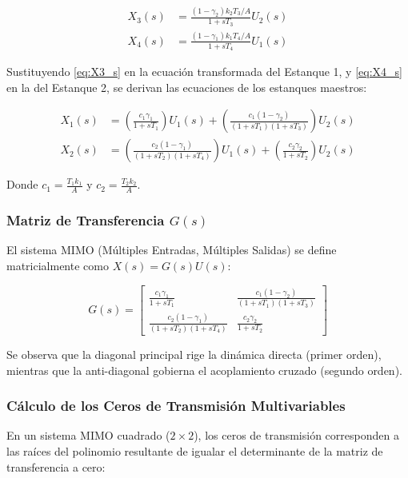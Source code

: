 \begin{align}
X_3(s) &= \frac{(1-\gamma_2) k_2 T_3 / A}{1 + sT_3} U_2(s) \label{eq:X3_s} \\
X_4(s) &= \frac{(1-\gamma_1) k_1 T_4 / A}{1 + sT_4} U_1(s) \label{eq:X4_s}
\end{align}

Sustituyendo \eqref{eq:X3_s} en la ecuación transformada del Estanque 1, y \eqref{eq:X4_s} en la del Estanque 2, se derivan las ecuaciones de los estanques maestros:

\begin{align}
X_1(s) &= \left( \frac{c_1 \gamma_1}{1 + sT_1} \right) U_1(s) + \left( \frac{c_1 (1-\gamma_2)}{(1+sT_1)(1+sT_3)} \right) U_2(s) \label{eq:X1_s} \\
X_2(s) &= \left( \frac{c_2 (1-\gamma_1)}{(1+sT_2)(1+sT_4)} \right) U_1(s) + \left( \frac{c_2 \gamma_2}{1 + sT_2} \right) U_2(s) \label{eq:X2_s}
\end{align}

Donde $c_1 = \frac{T_1 k_1}{A}$ y $c_2 = \frac{T_2 k_2}{A}$.

\subsubsection{Matriz de Transferencia $G(s)$}
El sistema MIMO (Múltiples Entradas, Múltiples Salidas) se define matricialmente como $X(s) = G(s)U(s)$:

\begin{equation}
G(s) = \begin{bmatrix} 
\frac{c_1 \gamma_1}{1 + sT_1} & \frac{c_1 (1-\gamma_2)}{(1+sT_1)(1+sT_3)} \\ 
\frac{c_2 (1-\gamma_1)}{(1+sT_2)(1+sT_4)} & \frac{c_2 \gamma_2}{1 + sT_2} 
\end{bmatrix}
\label{eq:matriz_Gs}
\end{equation}

Se observa que la diagonal principal rige la dinámica directa (primer orden), mientras que la anti-diagonal gobierna el acoplamiento cruzado (segundo orden).

\subsubsection{Cálculo de los Ceros de Transmisión Multivariables}
En un sistema MIMO cuadrado ($2 \times 2$), los ceros de transmisión corresponden a las raíces del polinomio resultante de igualar el determinante de la matriz de transferencia a cero:


